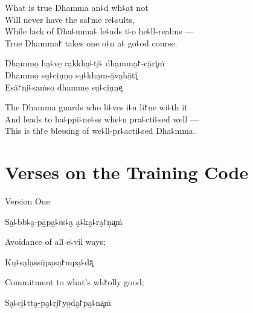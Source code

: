 \begin{english}
  What is true Dhamma an꜕d wh꜕at not\\
  Will never have the sa꜓me re꜕sults,\\
  While lack of Dha꜕mma꜕ le꜕ads t꜕o he꜕ll-realms ---\\
  True Dhamma꜓ takes one o꜕n a꜕ go꜕od course.
\end{english}

Dha̱mmo̱ ha̮꜕ve̱ ra̱kkha̮꜕ti̮꜕ dha̱mma̮꜓-cā̱ri͓ṁ\\
Dha̱mmo̱ su̮꜕ci̱ṇṇo̱ su̮꜕kha̮m-ā̱va̮hā̱ti͓\\
E̱sā̱꜓ni̮꜕sa̱ṁso̱ dha̱mme̱ su̮꜕ci̱ṇṇe͓


\begin{english}
  The Dhamma guards who li꜕ves i꜕n li꜓ne wi꜕th it\\
  And leads to ha꜕ppi꜕ne꜕ss whe꜕n pra꜕cti꜕sed well ---\\
  This is th꜓e blessing of we꜕ll-pr꜕acti꜕sed Dha꜕mma.
\end{english}

\chapter{Verses on the Training Code}


\begin{leader}
\end{leader}

\begin{instruction}
  Version One
\end{instruction}

Sa̱꜕bb꜕a̮-pā̱pa̱꜕ss꜕a̮ a̮꜕ka̮꜕ra̮꜓ṇa͓ṁ

\begin{english}
  Avoidance of all e꜕vil ways;
\end{english}

Ku̮꜕sa̮la̱ssū̱pa̮sa̱꜓mpa̮꜕dā͓

\begin{english}
  Commitment to what's wh꜓olly good;
\end{english}

Sa̮꜕ci̱꜕tta̮-pa̮꜕ri̮꜓yo̱da̮꜓pa̮꜕na͓ṁ

